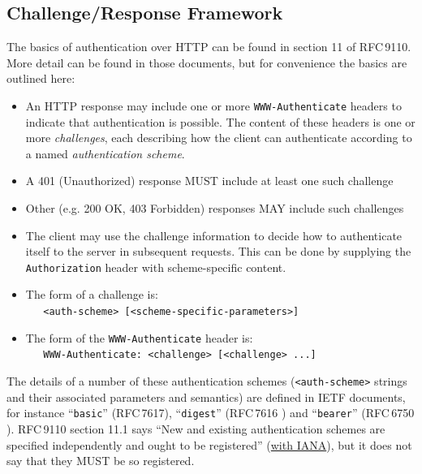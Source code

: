 \documentclass[11pt,a4paper]{ivoa}
\newcommand{\rfc}[1]{RFC\,#1}
\newcommand{\header}[1]{{\tt #1}}
\begin{document}
\subsection{Challenge/Response Framework}

The basics of authentication over HTTP can be found in
section 11 of \rfc{9110}.
More detail can be found in those documents, but for convenience
the basics are outlined here:
\begin{itemize}
  \item An HTTP response may include one or more 
        \header{WWW-Authenticate} headers
        to indicate that authentication is possible.
        The content of these headers is one or more {\em challenges},
        each describing how the client can authenticate according
        to a named {\em authentication scheme}.
  \item A 401 (Unauthorized) response MUST include at least one such challenge
  \item Other (e.g. 200 OK, 403 Forbidden) responses
        MAY include such challenges
  \item The client may use the challenge information to decide how
        to authenticate itself to the server in subsequent requests.
        This can be done by supplying the \header{Authorization} header
        with scheme-specific content.
  \item The form of a challenge is:\\
        \verb|   <auth-scheme> [<scheme-specific-parameters>]|
  \item The form of the \header{WWW-Authenticate} header is:\\
        \verb|   WWW-Authenticate: <challenge> [<challenge> ...]|
\end{itemize}


The details of a number of these authentication schemes
(\verb|<auth-scheme>| strings and their associated parameters and semantics)
are defined in IETF documents, for instance
``{\tt basic}'' (\rfc{7617}),
``{\tt digest}'' (\rfc{7616} \citet{std:RFC7616})
and
``{\tt bearer}'' (\rfc{6750} \citet{std:RFC6750}).
\rfc{9110} section 11.1 says
``New and existing authentication schemes are
  specified independently and ought to be registered''
  (\href{https://www.iana.org/assignments/http-authschemes}{with IANA}),
but it does not say that they MUST be so registered.
\end{document}
